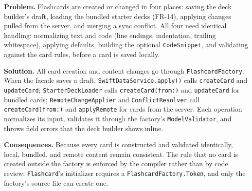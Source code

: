 \documentclass[12pt,letterpaper]{article}
\begin{document}
\textbf{Problem.} Flashcards are created or changed in four places: saving the deck
builder's draft, loading the bundled starter decks (FR-14), applying changes pulled
from the server, and merging a sync conflict. All four need identical handling:
normalizing text and code (line endings, indentation, trailing whitespace), applying
defaults, building the optional \texttt{CodeSnippet}, and validating against the card
rules, before a card is saved locally.

\textbf{Solution.} All card creation and content changes go through
\texttt{FlashcardFactory}. When the facade saves a draft,
\texttt{SwiftDataService.apply()} calls \texttt{createCard} and \texttt{updateCard};
\texttt{StarterDeckLoader} calls \texttt{createCard(from:)} and \texttt{updateCard} for
bundled cards; \texttt{RemoteChangeApplier} and \texttt{ConflictResolver} call
\texttt{createCard(from:)} and \texttt{applyRemote} for cards from the server. Each
operation normalizes its input, validates it through the factory's
\texttt{ModelValidator}, and throws field errors that the deck builder shows inline.

\textbf{Consequences.} Because every card is constructed and validated identically,
local, bundled, and remote content remain consistent. The rule that no card is created
outside the factory is enforced by the compiler rather than by code review:
\texttt{Flashcard}'s initializer requires a \texttt{FlashcardFactory.Token}, and only
the factory's source file can create one.

\FloatBarrier
\end{document}
